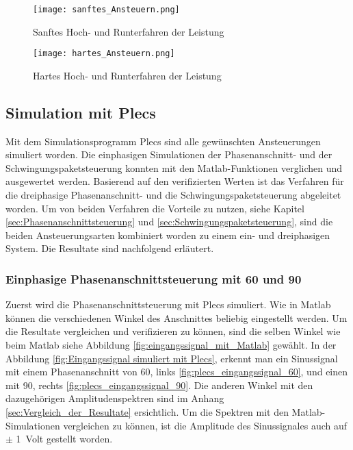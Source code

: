 \begin{figure}[ht!]
	\centering
	\texttt{[image: sanftes\_Ansteuern.png]}	
	\caption{Sanftes Hoch- und Runterfahren der Leistung}
	\label{fig:sanftes_Ansteuern}
\end{figure}

\begin{figure}[ht!]
	\centering
	\texttt{[image: hartes\_Ansteuern.png]}	
	\caption{Hartes Hoch- und Runterfahren der Leistung}
	\label{fig:hartes_Ansteuern}
\end{figure}




\newpage
\subsection{Simulation mit Plecs}

Mit dem Simulationsprogramm Plecs sind alle gewünschten Ansteuerungen simuliert worden. Die einphasigen Simulationen der Phasenanschnitt- und der Schwingungspaketsteuerung konnten mit den Matlab-Funktionen verglichen und ausgewertet werden. Basierend auf den verifizierten Werten ist das Verfahren für die dreiphasige Phasenanschnitt- und die Schwingungspaketsteuerung abgeleitet worden. Um von beiden Verfahren die Vorteile zu nutzen, siehe Kapitel \ref{sec:Phasenanschnittsteuerung} und \ref{sec:Schwingungspaketsteuerung}, sind die beiden Ansteuerungsarten kombiniert worden zu einem ein- und dreiphasigen System. Die Resultate sind nachfolgend erläutert.  

\subsubsection{Einphasige Phasenanschnittsteuerung mit 60 \textdegree \hspace{0.02cm} und 90 \textdegree}

Zuerst wird die Phasenanschnittsteuerung mit Plecs simuliert. Wie in Matlab können die verschiedenen Winkel des Anschnittes beliebig eingestellt werden. Um die Resultate vergleichen und verifizieren zu können, sind die selben Winkel wie beim Matlab siehe Abbildung \ref{fig:eingangssignal_mit_Matlab} gewählt. In der Abbildung \ref{fig:Eingangssignal simuliert mit Plecs}, erkennt man ein Sinussignal mit einem Phasenanschnitt von 60\textdegree \hspace{0.02cm}, links \ref{fig:plecs_eingangssignal_60}, und einen mit 90\textdegree \hspace{0.02cm}, rechts \ref{fig:plecs_eingangssignal_90}. Die anderen Winkel mit den dazugehörigen Amplitudenspektren sind im Anhang \ref{sec:Vergleich_der_Resultate} ersichtlich.
Um die Spektren mit den Matlab-Simulationen vergleichen zu können, ist die Amplitude des Sinussignales auch auf $\pm$ \SI{1}{Volt} gestellt worden.  

